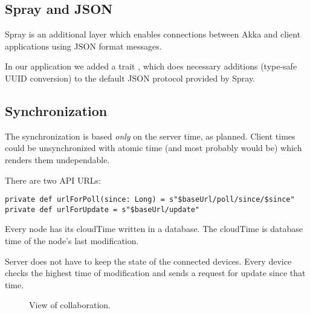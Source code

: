 \subsection{Spray and JSON}
\label{subsection:akka-spray}
Spray is an additional layer which enables connections between Akka and client applications using JSON format messages.

In our application we added a trait , which does necessary additions (type-safe UUID conversion) to the default JSON protocol provided by Spray.

\subsection{Synchronization}
\label{subsection:akka-synchro}
The synchronization is based \emph{only} on the server time, as planned. Client times could be unsynchronized with atomic time (and most probably would be) which renders them undependable.

There are two API URLs:

\begin{verbatim}
private def urlForPoll(since: Long) = s"$baseUrl/poll/since/$since"
private def urlForUpdate = s"$baseUrl/update"
\end{verbatim}

Every node has its cloudTime written in a database. The cloudTime is database time of the node's last modification.

Server does not have to keep the state of the connected devices. Every device checks the highest time of modification and sends a request for update since that time.


\begin{figure}[h]
	\centering
	\caption{View of collaboration.}
	\label{fig:screen-collaboration}
\end{figure}
